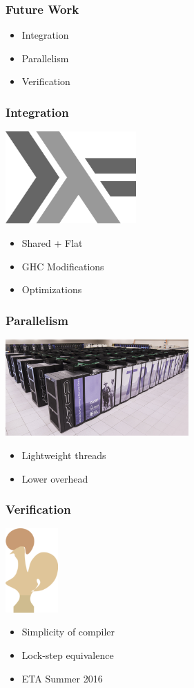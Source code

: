 \documentclass[17pt]{beamer}
\begin{document}
\begin{frame}
\frametitle{Future Work}
\begin{itemize}
\item Integration
\item Parallelism 
\item Verification
\end{itemize}
\end{frame}

\begin{frame}
\frametitle{Integration}
\centering
\includegraphics[width=5cm]{haskell}
\begin{itemize}
\item Shared + Flat
\item GHC Modifications
\item Optimizations 
\end{itemize}
\end{frame}

\begin{frame}
\frametitle{Parallelism}
\includegraphics[width=7cm]{trinity}
\centering
\begin{itemize}
\item Lightweight threads
\item Lower overhead
\end{itemize}
\end{frame}

\begin{frame}
\frametitle{Verification}
\centering
\includegraphics[width=2cm]{coq}
\begin{itemize}
\item Simplicity of compiler
\item Lock-step equivalence
\item ETA Summer 2016
\end{itemize}
\end{frame}
\end{document}
